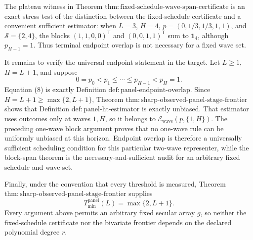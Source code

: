 The plateau witness in Theorem \(\mathrm{thm:fixed\text{-}schedule\text{-}wave\text{-}span\text{-}certificate}\) is an exact stress test of the distinction between the fixed-schedule certificate and a convenient sufficient estimator: when \(L=3\), \(H=4\), \(p=(0,1/3,1/3,1,1)\), and \(\mathcal S=\{2,4\}\), the blocks \((1,1,0,0)^{\mathsf T}\) and \((0,0,1,1)^{\mathsf T}\) sum to \(\mathbf 1_4\), although \(p_{H-1}=1\).  Thus terminal endpoint overlap is not necessary for a fixed wave set.

It remains to verify the universal endpoint statement in the target.  Let \(L\ge1\), \(H=L+1\), and suppose
\[
 0=p_0<p_1\le\cdots\le p_{H-1}<p_H=1.
\tag{8}
\]
Equation (8) is exactly Definition \(\mathrm{def:panel\text{-}endpoint\text{-}overlap}\).  Since \(H=L+1\ge\max\{2,L+1\}\), Theorem \(\mathrm{thm:sharp\text{-}observed\text{-}panel\text{-}stage\text{-}frontier}\) shows that Definition \(\mathrm{def:panel\text{-}ht\text{-}estimator}\) is exactly unbiased.  That estimator uses outcomes only at waves \(1,H\), so it belongs to \(\mathcal E_{\mathrm{wave}}(p,\{1,H\})\).  The preceding one-wave block argument proves that no one-wave rule can be uniformly unbiased at this horizon.  Endpoint overlap is therefore a universally sufficient scheduling condition for this particular two-wave representer, while the block-span theorem is the necessary-and-sufficient audit for an arbitrary fixed schedule and wave set.

Finally, under the convention that every threshold is measured, Theorem \(\mathrm{thm:sharp\text{-}observed\text{-}panel\text{-}stage\text{-}frontier}\) supplies
\[
 T_{\min}^{\mathrm{panel}}(L)=\max\{2,L+1\}.
\]
Every argument above permits an arbitrary fixed secular array \(g\), so neither the fixed-schedule certificate nor the bivariate frontier depends on the declared polynomial degree \(r\).